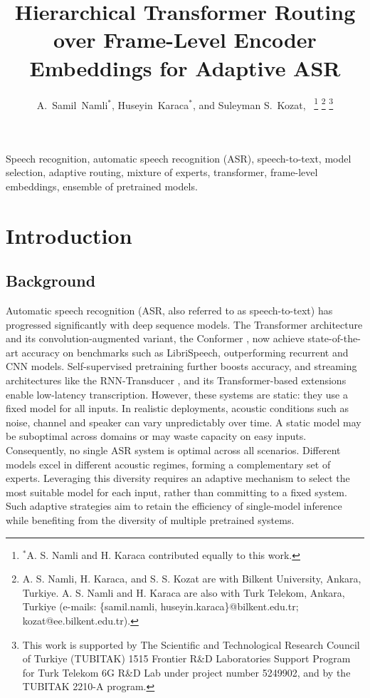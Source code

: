 \documentclass[journal]{IEEEtran}
\title{Hierarchical Transformer Routing over Frame-Level Encoder Embeddings for Adaptive ASR}
\author{A.~Samil~Namli$^{*}$, 
        Huseyin~Karaca$^{*}$,
        and Suleyman S.~Kozat,~\IEEEmembership{Senior~Member,~IEEE}
\thanks{$^{*}$A. S. Namli and H. Karaca contributed equally to this work.}
\thanks{A. S. Namli, H. Karaca, and S. S. Kozat are with Bilkent University, Ankara, Turkiye. A. S. Namli and H. Karaca are also with Turk Telekom, Ankara, Turkiye (e-mails: \{samil.namli, huseyin.karaca\}@bilkent.edu.tr; kozat@ee.bilkent.edu.tr).}%
\thanks{This work is supported by The Scientific and Technological Research Council of Turkiye (TUBITAK) 1515 Frontier R\&D Laboratories Support Program for Turk Telekom 6G R\&D Lab under project number 5249902, and by the TUBITAK 2210-A program.}%
}
\date{}
\begin{document}
\maketitle 

\begin{abstract}

\end{abstract}

\begin{IEEEkeywords}
Speech recognition, automatic speech recognition (ASR),
speech-to-text, model selection, adaptive routing, mixture of
experts, transformer, frame-level embeddings, ensemble of pretrained
models.
\end{IEEEkeywords}


\section{Introduction}
\label{sec:introduction}

\subsection{Background}

Automatic speech recognition (ASR, also referred to as speech-to-text) has progressed significantly with deep sequence models. The Transformer architecture \cite{vaswani2017attention}
 and its convolution-augmented variant, the Conformer \cite{gulati2020conformer}, now achieve state-of-the-art accuracy on benchmarks such as LibriSpeech, outperforming recurrent and CNN models. Self-supervised pretraining \cite{baevski2020wav2vec} further boosts accuracy, and streaming architectures like the RNN-Transducer \cite{Graves2012SequenceTW}, and its Transformer-based extensions enable low-latency transcription. However, these systems are static: they use a fixed model for all inputs. In realistic deployments, acoustic conditions such as noise, channel and speaker can vary unpredictably over time. A static model may be suboptimal across domains or may waste capacity on easy inputs. Consequently, no single ASR system is optimal across all scenarios. Different models excel in different acoustic regimes, forming a complementary set of experts. Leveraging this diversity requires an adaptive mechanism to select the most suitable model for each input, rather than committing to a fixed system. Such adaptive strategies aim to retain the efficiency of single-model inference while benefiting from the diversity of multiple pretrained systems.
\end{document}
